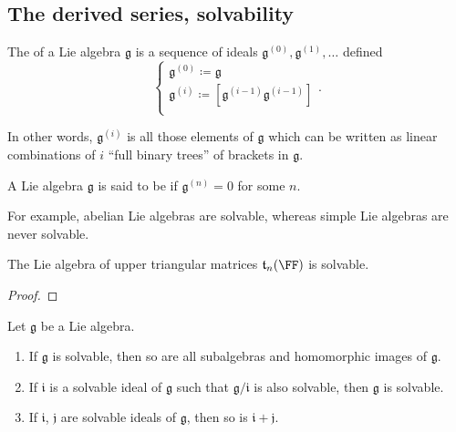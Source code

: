 \documentclass{article}
\newcommand{\lb}[1]{\ensuremath{\left[{#1}\right]}}
\newcommand{\frkg}{{\ensuremath{\mathfrak{g}}}}
\newcommand{\frki}{{\ensuremath{\mathfrak{i}}}}
\newcommand{\frkj}{{\ensuremath{\mathfrak{j}}}}
\newcommand{\talg}{\ensuremath{\mathfrak{t}}}
\begin{document}
\subsection{The derived series, solvability}

\begin{definition}
    The  of a Lie algebra $\frkg$ is a sequence of ideals $\frkg^{(0)}, \frkg^{(1)}, \ldots$ defined
    \[
        \begin{cases}
            \frkg^{(0)} \coloneq \frkg \\
            \frkg^{(i)} \coloneq \lb{\frkg^{(i-1)}\frkg^{(i-1)}} \\
        \end{cases}.
    \]
\end{definition}

In other words, $\frkg^{(i)}$ is all those elements of $\frkg$ which can be written as linear combinations of $i$ ``full binary trees'' of brackets in $\frkg$.

\begin{definition}
    A Lie algebra $\frkg$ is said to be  if $\frkg^{(n)} = 0$ for some $n$.
\end{definition}

For example, abelian Lie algebras are solvable, whereas simple Lie algebras are never solvable.

\begin{proposition}
    The Lie algebra of upper triangular matrices $\talg_n(\FF)$ is solvable.
\end{proposition}
\begin{proof}
\end{proof}

\begin{theorem}
    Let $\frkg$ be a Lie algebra.
    \begin{enumerate}[label=(\alph*)]
        \item 
            If $\frkg$ is solvable, then so are all subalgebras and homomorphic images of $\frkg$.
        \item 
            If $\frki$ is a solvable ideal of $\frkg$ such that $\frkg/\frki$ is also solvable, then $\frkg$ is solvable.
        \item 
            If $\frki$, $\frkj$ are solvable ideals of $\frkg$, then so is $\frki + \frkj$.
    \end{enumerate}
\end{theorem}
\end{document}
